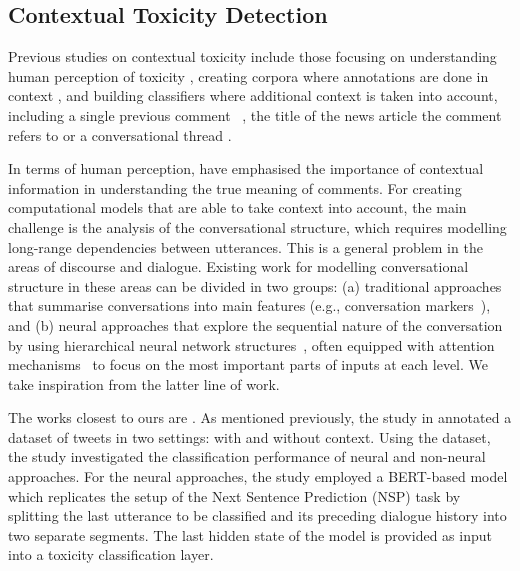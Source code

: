 \documentclass[acmsmall]{acmart}
\begin{document}
\subsection{Contextual Toxicity Detection}
 
Previous studies on contextual toxicity include those focusing on understanding human perception of toxicity  \cite{pavlopoulos-etal-2020-toxicity,FBK}, creating corpora where annotations are done in context \cite{contextual_abuse,vidgen-etal-2021-introducing,onabola2021hbert,FBK,xu-etal-2021-bot,dialogue_safety,hs-cn-dataset}, and building classifiers where additional context is taken into account, including a single previous comment ~\cite{pavlopoulos-etal-2020-toxicity}, the title of the news article the comment refers to \cite{gao-huang-2017-detecting} or a conversational thread \cite{FBK,dialogue_safety,xu-etal-2021-bot}. 

In terms of human perception, \cite{pavlopoulos-etal-2020-toxicity,FBK} have emphasised the importance of contextual information in understanding the true meaning of comments. For creating computational models that are able to take context into account, the main challenge is the analysis of the conversational structure, which requires modelling long-range dependencies between utterances. This is a general problem in the areas of discourse and dialogue.  Existing work for modelling conversational structure in these areas can be divided in two groups: (a) traditional approaches that summarise conversations into main features (e.g., conversation markers~\cite{niculae-danescu-niculescu-mizil-2016-conversational}), and (b) neural approaches that explore the sequential nature of the conversation by using hierarchical neural network structures~\cite{chang-danescu-niculescu-mizil-2019-trouble}, often equipped with attention mechanisms~\cite{de-kock-vlachos-2021-beg} to focus on the most important parts of inputs at each level. We take inspiration from the latter line of work. 

The works closest to ours are \cite{FBK,dialogue_safety,xu-etal-2021-bot}. As mentioned previously, the study in \cite{FBK} annotated a dataset of tweets in two settings: with and without context. Using the dataset, the study investigated the classification performance of neural and non-neural approaches. For the neural approaches, the study employed a BERT-based model \cite{devlin-etal-2019-bert} which replicates the setup of the Next Sentence Prediction (NSP) task by splitting the last utterance to be classified and its preceding dialogue history into two separate segments. The last hidden state of the model is provided as input into a toxicity classification layer. 
\end{document}
